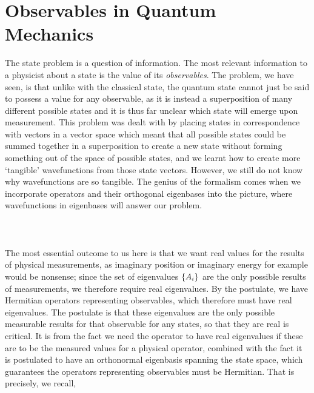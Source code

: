 \section{Observables in Quantum Mechanics}
The state problem is a question of information. The most relevant information to a physicist about a state is the value of its \textit{observables}. The problem, we have seen, is that unlike with the classical state, the quantum state cannot just be said to possess a value for any observable, as it is instead a superposition of many different possible states and it is thus far unclear which state will emerge upon measurement. This problem was dealt with by placing states in correspondence with vectors in a vector space which meant that all possible states could be summed together in a superposition to create a new state without forming something out of the space of possible states, and we learnt how to create more `tangible' wavefunctions from those state vectors. However, we still do not know why wavefunctions are so tangible. The genius of the formalism comes when we incorporate operators and their orthogonal eigenbases into the picture, where wavefunctions in eigenbases will answer our problem.
\\\\
\\\\
The most essential outcome to us here is that we want real values for the results of physical measurements, as imaginary position or imaginary energy for example would be nonsense; since the set of eigenvalues $\{A_{i}\}$ are the only possible results of measurements, we therefore require real eigenvalues. By the postulate, we have Hermitian operators representing observables, which therefore must have real eigenvalues. The postulate is that these eigenvalues are the only possible measurable results for that observable for any states, so that they are real is critical. It is from the fact we need the operator to have real eigenvalues if these are to be the measured values for a physical operator, combined with the fact it is postulated to have an orthonormal eigenbasis spanning the state space, which guarantees the operators representing observables must be Hermitian. That is precisely, we recall,
